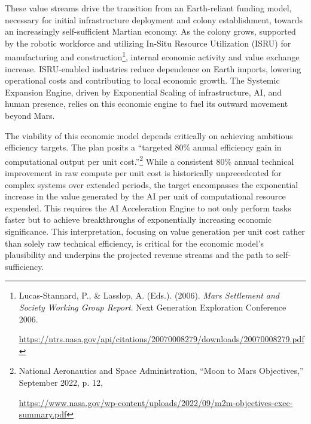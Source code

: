 \documentclass[fontsize=10pt, oneside, DIV=calc]{scrartcl}
\begin{document}
\medskip

\noindent
These value streams drive the transition from an Earth-reliant funding model, necessary for initial infrastructure deployment and colony establishment, towards an increasingly self-sufficient Martian economy. As the colony grows, supported by the robotic workforce and utilizing In-Situ Resource Utilization (ISRU) for manufacturing and construction\footnote{Lucas-Stannard, P., \& Lasslop, A. (Eds.). (2006). \textit{Mars Settlement and Society Working Group Report}. Next Generation Exploration Conference 2006. 







\href{https://ntrs.nasa.gov/api/citations/20070008279/downloads/20070008279.pdf}\url{https://ntrs.nasa.gov/api/citations/20070008279/downloads/20070008279.pdf}}, internal economic activity and value exchange increase. ISRU-enabled industries reduce dependence on Earth imports, lowering operational costs and contributing to local economic growth. The Systemic Expansion Engine, driven by Exponential Scaling of infrastructure, AI, and human presence, relies on this economic engine to fuel its outward movement beyond Mars.

\medskip

\noindent
The viability of this economic model depends critically on achieving ambitious efficiency targets. The plan posits a ``targeted 80\% annual efficiency gain in computational output per unit cost.''\footnote{National Aeronautics and Space Administration, ``Moon to Mars Objectives,'' September 2022, p. 12, 







\href{https://www.nasa.gov/wp-content/uploads/2022/09/m2m-objectives-exec-summary.pdf}\url{https://www.nasa.gov/wp-content/uploads/2022/09/m2m-objectives-exec-summary.pdf}} While a consistent 80\% annual technical improvement in raw compute per unit cost is historically unprecedented for complex systems over extended periods, the target encompasses the exponential increase in the value generated by the AI per unit of computational resource expended. This requires the AI Acceleration Engine to not only perform tasks faster but to achieve breakthroughs of exponentially increasing economic significance. This interpretation, focusing on value generation per unit cost rather than solely raw technical efficiency, is critical for the economic model's plausibility and underpins the projected revenue streams and the path to self-sufficiency.
\end{document}

